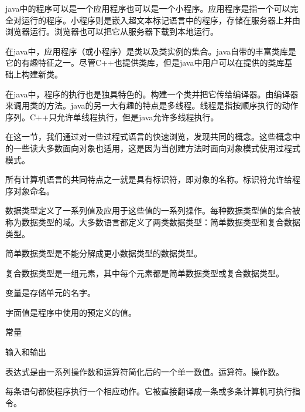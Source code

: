 java中的程序可以是一个应用程序也可以是一个小程序。应用程序是指一个可以完全对运行的程序。小程序则是嵌入超文本标记语言中的程序，存储在服务器上并由浏览器运行。浏览器也可以把它从服务器下载到本地运行。

在java中，应用程序（或小程序）是类以及类实例的集合。java自带的丰富类库是它的有趣特征之一。尽管C++也提供类库，但是java中用户可以在提供的类库基础上构建新类。

在java中，程序的执行也是独具特色的。构建一个类并把它传给编译器。由编译器来调用类的方法。java的另一大有趣的特点是多线程。线程是指按顺序执行的动作序列。C++只允许单线程执行，但是java允许多线程执行。

在这一节，我们通过对一些过程式语言的快速浏览，发现共同的概念。这些概念中的一些读大多数面向对象也适用，这是因为当创建方法时面向对象模式使用过程式模式。

所有计算机语言的共同特点之一就是具有标识符，即对象的名称。标识符允许给程序对象命名。

数据类型定义了一系列值及应用于这些值的一系列操作。每种数据类型值的集合被称为数据类型的域。大多数语言都定义了两类数据类型：简单数据类型和复合数据类型。

简单数据类型是不能分解成更小数据类型的数据类型。

复合数据类型是一组元素，其中每个元素都是简单数据类型或复合数据类型。

变量是存储单元的名字。

字面值是程序中使用的预定义的值。

常量

输入和输出

表达式是由一系列操作数和运算符简化后的一个单一数值。运算符。操作数。

每条语句都使程序执行一个相应动作。它被直接翻译成一条或多条计算机可执行指令。

